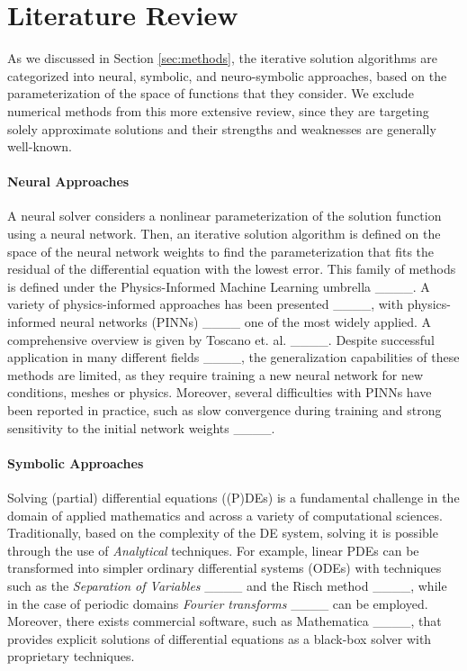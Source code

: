 \section{Literature Review}
\label{sm:literature review}
As we discussed in Section \ref{sec:methods}, the iterative solution algorithms are categorized into neural, symbolic, and neuro-symbolic approaches, based on the parameterization of the space of functions that they consider. 
We exclude numerical methods from this more extensive review, since they are targeting solely approximate solutions and their strengths and weaknesses are generally well-known.

\paragraph{Neural Approaches} A neural solver considers a nonlinear parameterization of the solution function using a neural network. Then, an iterative solution algorithm is defined on the space of the neural network weights to find the parameterization that fits the residual of the differential equation with the lowest error. This family of methods is defined under the Physics-Informed Machine Learning umbrella ____. A variety of physics-informed approaches has been presented ____, with physics-informed neural networks (PINNs)  ____ one of the most widely applied.  A comprehensive overview is given by Toscano et. al. ____. Despite successful application in many different fields ____, the generalization capabilities of these methods are limited, as they require training a new neural network for new conditions, meshes or physics. Moreover, several difficulties with PINNs have been reported in practice, such as slow convergence during training and strong sensitivity to the initial network weights ____.


\paragraph{Symbolic Approaches} Solving (partial) differential equations ((P)DEs) is a fundamental challenge in the domain of applied mathematics and across a variety of computational sciences. Traditionally, based on the complexity of the DE system, solving it is possible through the use of \textit{Analytical} techniques. For example, linear PDEs can be transformed into simpler ordinary differential systems (ODEs) with techniques such as the \textit{Separation of Variables} ____ and the Risch method ____, while in the case of periodic domains \textit{Fourier transforms} ____ can be employed. Moreover, there exists commercial software, such as Mathematica ____, that provides explicit solutions of differential equations as a black-box solver with proprietary techniques. 

